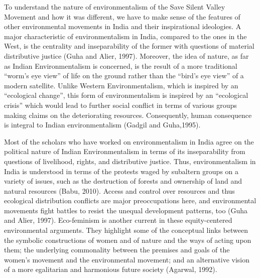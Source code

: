 \documentclass[twoside, 13pt]{article}
\begin{document}
{\fontsize{12}{14}\selectfont To understand the nature of environmentalism of the Save Silent Valley Movement and how it was different, we have to make sense of the features of other environmental movements in India and their inspirational ideologies. A major characteristic of environmentalism in India, compared to the ones in the West, is the centrality and inseparability of the former with questions of material distributive justice (Guha and Alier, 1997). Moreover, the idea of nature, as far as Indian Environmentalism is concerned, is the result of a more traditional “worm’s eye view” of life on the ground rather than the “bird’s eye view” of a modern satellite. Unlike Western Environmentalism, which is inspired by an “ecological change”, this form of environmentalism is inspired by an “ecological crisis” which would lead to further social conflict in terms of various groups making claims on the deteriorating resources. Consequently, human consequence is integral to Indian environmentalism (Gadgil and Guha,1995). 

Most of the scholars who have worked on environmentalism in India agree on the political nature of Indian Environmentalism in terms of its inseparability from questions of livelihood, rights, and distributive justice. Thus, environmentalism in India is understood in terms of the protests waged by subaltern groups on a variety of issues, such as the destruction of forests and ownership of land and natural resources (Babu, 2010). Access and control over resources and thus ecological distribution conflicts are major preoccupations here, and environmental movements fight battles to resist the unequal development patterns, too (Guha and Alier, 1997). Eco-feminism is another current in these equity-centered environmental arguments. They highlight some of the conceptual links between the symbolic constructions of women and of nature and the ways of acting upon them; the underlying commonality between the premises and goals of the women's movement and the environmental movement; and an alternative vision of a more egalitarian and harmonious future society (Agarwal, 1992).


}
\end{document}
